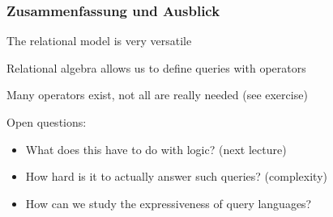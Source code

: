 \documentclass[onlymath]{beamer}
\begin{document}
\begin{frame}\frametitle{Zusammenfassung und Ausblick}

The relational model is very versatile
\bigskip

Relational algebra allows us to define queries with operators
\bigskip

Many operators exist, not all are really needed (see exercise)
\bigskip

Open questions:
\begin{itemize}
\item What does this have to do with logic? (next lecture)
\item How hard is it to actually answer such queries? (complexity)
\item How can we study the expressiveness of query languages?
\end{itemize}

\end{frame}
\end{document}

